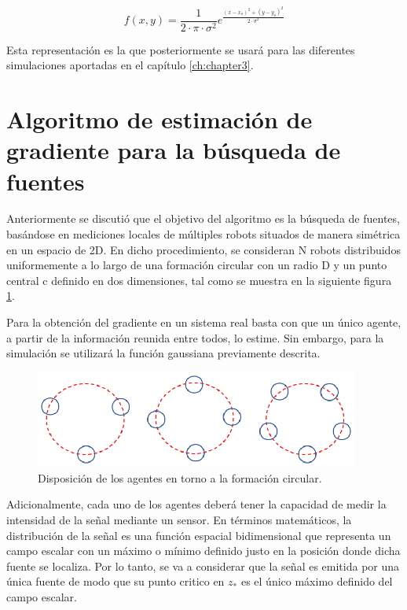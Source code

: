 \begin{equation}
	f\left(x,y\right)=\frac{1}{2\cdot{\pi}\cdot{\sigma^{2}}}e^{\frac{\left(x-x_{o}\right)^{2}+\left(y-y_{o}\right)^{2}}{2\cdot{\sigma^2}}}
\end{equation}

Esta representación es la que posteriormente se usará para las diferentes simulaciones aportadas en el capítulo \ref{ch:chapter3}. 

\section{Algoritmo de estimación de gradiente para la búsqueda de fuentes} \label{Estima}

Anteriormente se discutió que el objetivo del algoritmo es la búsqueda de fuentes, basándose en mediciones locales de múltiples robots situados de manera simétrica en un espacio de 2D. En dicho procedimiento, se consideran N robots distribuidos uniformemente a lo largo de una formación circular con un radio D y un punto central c definido en dos dimensiones, tal como se muestra en la siguiente figura \ref{Disp:Robots}.

Para la obtención del gradiente en un sistema real basta con que un único agente, a partir de la información reunida entre todos, lo estime. Sin embargo, para la simulación se utilizará la función gaussiana previamente descrita.

\begin{figure}[htb]
\centering
\includegraphics[width=0.95\textwidth]{figures/Disposicion_Robots.eps}
\caption{Disposición de los agentes en torno a la formación circular.} \label{Disp:Robots}
\end{figure}

Adicionalmente, cada uno de los agentes deberá tener la capacidad de medir la intensidad de la señal mediante un sensor. En términos matemáticos, la distribución de la señal es una función espacial bidimensional que representa un campo escalar con un máximo o mínimo definido justo en la posición donde dicha fuente se localiza. Por lo tanto, se va a considerar que la señal es emitida por una única fuente de modo que su punto critico en $z_*$ es el único máximo definido del campo escalar.

